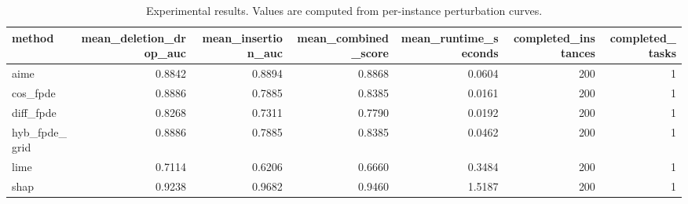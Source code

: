 \begin{table}[t]
\caption{Experimental results. Values are computed from per-instance perturbation curves.}
\label{tab:main_results_computed}
\centering
\begin{tabular}{lrrrrrr}
\toprule
method & mean\_deletion\_drop\_auc & mean\_insertion\_auc & mean\_combined\_score & mean\_runtime\_seconds & completed\_instances & completed\_tasks \\
\midrule
aime & 0.8842 & 0.8894 & 0.8868 & 0.0604 & 200 & 1 \\
cos\_fpde & 0.8886 & 0.7885 & 0.8385 & 0.0161 & 200 & 1 \\
diff\_fpde & 0.8268 & 0.7311 & 0.7790 & 0.0192 & 200 & 1 \\
hyb\_fpde\_grid & 0.8886 & 0.7885 & 0.8385 & 0.0462 & 200 & 1 \\
lime & 0.7114 & 0.6206 & 0.6660 & 0.3484 & 200 & 1 \\
shap & 0.9238 & 0.9682 & 0.9460 & 1.5187 & 200 & 1 \\
\bottomrule
\end{tabular}

\end{table}
